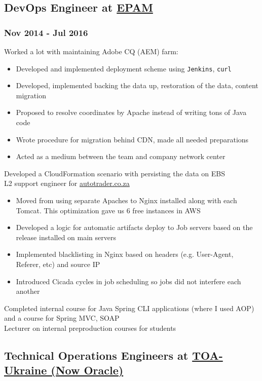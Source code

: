 \documentclass[letterpaper]{article}
\begin{document}
\subsection{DevOps Engineer at \href{https://epam.com}{EPAM}}
\label{sec-2-3}
\subsubsection{Nov 2014 - Jul 2016}
\label{sec-2-3-1}
Worked a lot with maintaining Adobe CQ (AEM) farm:
\begin{itemize}
\item Developed and implemented deployment scheme using \verb~Jenkins~, \verb~curl~
\item Developed, implemented backing the data up, restoration of the data, content migration
\item Proposed to resolve coordinates by Apache instead of writing tons of Java code
\item Wrote procedure for migration behind CDN, made all needed preparations
\item Acted as a medium between the team and company network center
\end{itemize}
Developed a CloudFormation scenario with persisting the data on EBS\\
L2 support engineer for \href{http://autotrader.co.za}{autotrader.co.za}
\begin{itemize}
\item Moved from using separate Apaches to Nginx installed along with each Tomcat. This optimization gave us 6 free instances in AWS
\item Developed a logic for automatic artifacts deploy to Job servers based on the release installed on main servers
\item Implemented blacklisting in Nginx based on headers (e.g. User-Agent, Referer, etc) and source IP
\item Introduced Cicada cycles in job scheduling so jobs did not interfere each another
\end{itemize}
Completed internal course for Java Spring CLI applications (where I used AOP) and a course for Spring MVC, SOAP\\
Lecturer on internal preproduction courses for students
\subsection{Technical Operations Engineers at \href{http://toa-ukraine.com}{TOA-Ukraine (Now Oracle)}}
\label{sec-2-4}
\end{document}
